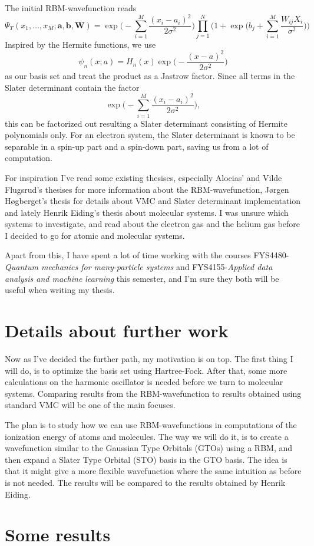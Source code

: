 \documentclass[10pt]{article}
\begin{document}
The initial RBM-wavefunction reads
\begin{equation}
\Psi_T(x_1,\hdots,x_M; \boldsymbol{a}, \boldsymbol{b}, \boldsymbol{W}) = \exp\bigg(-\sum_{i=1}^M\frac{(x_i-a_i)^2}{2\sigma^2}\bigg)\prod_{j=1}^N\bigg(1+\exp\Big(b_j+\sum_{i=1}^M\frac{W_{ij}X_i}{\sigma^2}\Big)\bigg)
\end{equation}
Inspired by the Hermite functions, we use
\begin{equation}
\psi_n(x;a)=H_n(x)\exp\bigg(-\frac{(x-a)^2}{2\sigma^2}\bigg)
\end{equation}
as our basis set and treat the product as a Jastrow factor. Since all terms in the Slater determinant contain the factor
\begin{equation}
\exp\bigg(-\sum_{i=1}^M\frac{(x_i-a_i)^2}{2\sigma^2}\bigg),
\end{equation}
this can be factorized out resulting a Slater determinant consisting of Hermite polynomials only. For an electron system, the Slater determinant is known to be separable in a spin-up part and a spin-down part, saving us from a lot of computation. 

For inspiration I've read some existing thesises, especially Alocias' and Vilde Flugsrud's thesises for more information about the RBM-wavefunction, Jørgen Høgberget's thesis for details about VMC and Slater determinant implementation and lately Henrik Eiding's thesis about molecular systems. I was unsure which systems to investigate, and read about the electron gas and the helium gas before I decided to go for atomic and molecular systems. 

Apart from this, I have spent a lot of time working with the courses FYS4480-\textit{Quantum mechanics for many-particle systems} and FYS4155-\textit{Applied data analysis and machine learning} this semester, and I'm sure they both will be useful when writing my thesis.

\section*{Details about further work}
Now as I've decided the further path, my motivation is on top. The first thing I will do, is to optimize the basis set using Hartree-Fock. After that, some more calculations on the harmonic oscillator is needed before we turn to molecular systems. Comparing results from the RBM-wavefunction to results obtained using standard VMC will be one of the main focuses. 

The plan is to study how we can use RBM-wavefunctions in computations of the ionization energy of atoms and molecules. The way we will do it, is to create a wavefunction similar to the Gaussian Type Orbitals (GTOs) using a RBM, and then expand a Slater Type Orbital (STO) basis in the GTO basis. The idea is that it might give a more flexible wavefunction where the same intuition as before is not needed. The results will be compared to the results obtained by Henrik Eiding. 

\section*{Some results}
\end{document}
